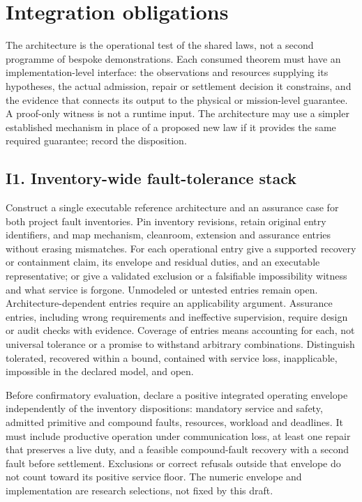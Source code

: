 \documentclass[11pt]{article}
\begin{document}
\section{Integration obligations}\label{sec:integration}
The architecture is the operational test of the shared laws, not a second programme of bespoke demonstrations. Each consumed theorem must have an implementation-level interface: the observations and resources supplying its hypotheses, the actual admission, repair or settlement decision it constrains, and the evidence that connects its output to the physical or mission-level guarantee. A proof-only witness is not a runtime input. The architecture may use a simpler established mechanism in place of a proposed new law if it provides the same required guarantee; record the disposition.

\subsection*{I1. Inventory-wide fault-tolerance stack}
Construct a single executable reference architecture and an assurance case for both project fault inventories. Pin inventory revisions, retain original entry identifiers, and map mechanism, cleanroom, extension and assurance entries without erasing mismatches. For each operational entry give a supported recovery or containment claim, its envelope and residual duties, and an executable representative; or give a validated exclusion or a falsifiable impossibility witness and what service is forgone. Unmodeled or untested entries remain open. Architecture-dependent entries require an applicability argument. Assurance entries, including wrong requirements and ineffective supervision, require design or audit checks with evidence. Coverage of entries means accounting for each, not universal tolerance or a promise to withstand arbitrary combinations. Distinguish tolerated, recovered within a bound, contained with service loss, inapplicable, impossible in the declared model, and open.

Before confirmatory evaluation, declare a positive integrated operating envelope independently of the inventory dispositions: mandatory service and safety, admitted primitive and compound faults, resources, workload and deadlines. It must include productive operation under communication loss, at least one repair that preserves a live duty, and a feasible compound-fault recovery with a second fault before settlement. Exclusions or correct refusals outside that envelope do not count toward its positive service floor. The numeric envelope and implementation are research selections, not fixed by this draft.
\end{document}
